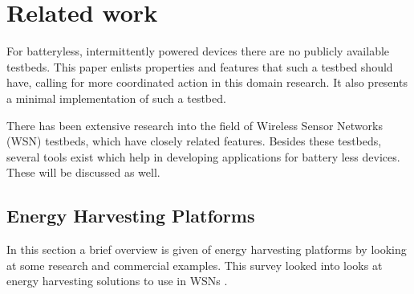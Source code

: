 \chapter{Related work}
\label{chp:related-work}


For batteryless, intermittently powered devices there are no publicly available testbeds. This paper \cite{request} enlists properties and features that such a testbed should have, calling for more coordinated action in this domain research. It also presents a minimal implementation of such a testbed.

There has been extensive research into the field of Wireless Sensor Networks (WSN) testbeds, which have closely related features. Besides these testbeds, several tools exist which help in developing applications for battery less devices. These will be discussed as well.

\section{Energy Harvesting Platforms}

In this section a brief overview is given of energy harvesting platforms by looking at some research and commercial examples. This survey looked into looks at energy harvesting solutions to use in WSNs \cite{energywsn}.

